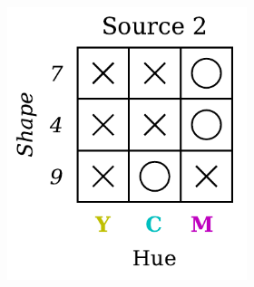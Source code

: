 \begin{dataset}
\begin{figure}[H]
\begin{subfigure}[b]{0.45\textwidth}
\begin{subfigure}[b]{0.48\textwidth}
                \includegraphics[width=\textwidth]{img/datasets/3-CGO_fact=hue_env=1.pdf}
            \end{subfigure}
        \end{subfigure}
        \hfill
        \begin{subfigure}[b]{0.45\textwidth}
            \centering
            \begin{subfigure}[b]{0.48\textwidth}
                \centering

\end{subfigure}
\end{subfigure}
\end{figure}
\end{dataset}
